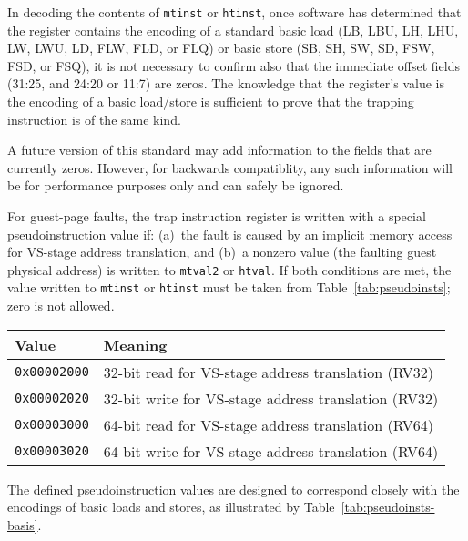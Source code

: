 \begin{commentary}
In decoding the contents of {\tt mtinst} or {\tt htinst}, once software
has determined that the register contains the encoding of a standard
basic load (LB, LBU, LH, LHU, LW, LWU, LD, FLW, FLD, or FLQ) or basic
store (SB, SH, SW, SD, FSW, FSD, or FSQ), it is not necessary to confirm
also that the immediate offset fields (31:25, and 24:20 or 11:7) are
zeros.
The knowledge that the register's value is the encoding of a basic
load/store is sufficient to prove that the trapping instruction is of the
same kind.

A future version of this standard may add information to the fields that
are currently zeros.
However, for backwards compatiblity, any such information will be for
performance purposes only and can safely be ignored.
\end{commentary}

For guest-page faults, the trap instruction register is written with a
special pseudoinstruction value if:
(a)~the fault is caused by an implicit memory access for VS-stage address
translation, and
(b)~a nonzero value (the faulting guest physical address) is written to
{\tt mtval2} or {\tt htval}.
If both conditions are met, the value written to {\tt mtinst} or
{\tt htinst} must be taken from Table~\ref{tab:pseudoinsts};
zero is not allowed.

\begin{table*}[h!]
\begin{center}
\begin{tabular}{|l|l|}
\hline
Value            & Meaning \\
\hline
{\tt 0x00002000} & 32-bit read for VS-stage address translation (RV32) \\
{\tt 0x00002020} & 32-bit write for VS-stage address translation (RV32) \\
\hline
{\tt 0x00003000} & 64-bit read for VS-stage address translation (RV64) \\
{\tt 0x00003020} & 64-bit write for VS-stage address translation (RV64) \\
\hline
\end{tabular}
\end{center}
\caption{Special pseudoinstruction values for guest-page faults.
The RV32 values are used when VSXLEN=32, and the RV64 values when VSXLEN=64.}
\label{tab:pseudoinsts}
\end{table*}

The defined pseudoinstruction values are designed to correspond closely
with the encodings of basic loads and stores, as illustrated by
Table~\ref{tab:pseudoinsts-basis}.

